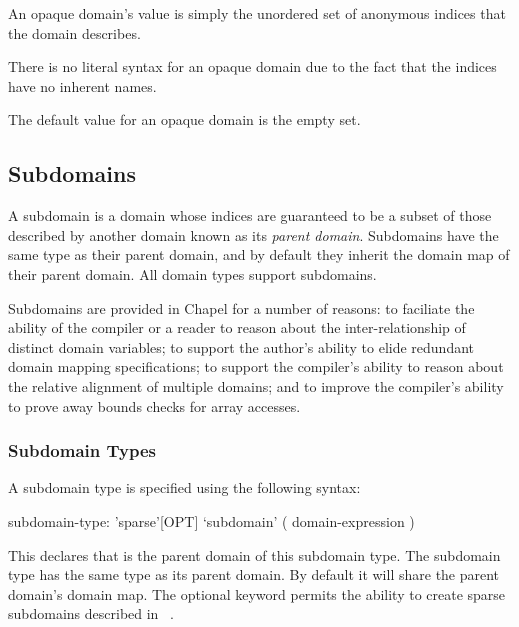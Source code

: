 An opaque domain's value is simply the unordered set of anonymous
indices that the domain describes.


There is no literal syntax for an opaque domain due to the fact that
the indices have no inherent names.


The default value for an opaque domain is the empty set.


\subsection{Subdomains}
\label{Subdomains}

A subdomain is a domain whose indices are guaranteed to be a subset of
those described by another domain known as its \emph{parent domain}.
Subdomains have the same type as their parent domain, and by default
they inherit the domain map of their parent domain.  All domain types
support subdomains.

\begin{rationale}
Subdomains are provided in Chapel for a number of reasons: to
faciliate the ability of the compiler or a reader to reason about the
inter-relationship of distinct domain variables; to support the
author's ability to elide redundant domain mapping specifications; to
support the compiler's ability to reason about the relative alignment
of multiple domains; and to improve the compiler's ability to prove
away bounds checks for array accesses.
\end{rationale}

\subsubsection{Subdomain Types}
\label{Subdomain_Types}

A subdomain type is specified using the following syntax:
\begin{syntax}
subdomain-type:
  'sparse'[OPT] `subdomain' ( domain-expression )
\end{syntax}
This declares that  is the parent domain of
this subdomain type.  The subdomain type has the same type as its
parent domain.  By default it will share the parent domain's domain
map.  The optional  keyword permits the ability to
create sparse subdomains described in ~.

